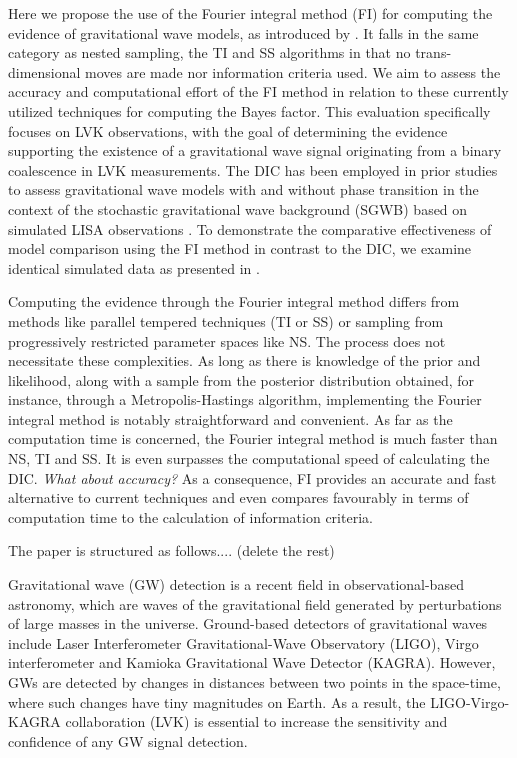 \documentclass[%
 reprint,
 amsmath,amssymb,
 aps,
]{revtex4-2}
\begin{document}
Here we propose the use of the Fourier integral method (FI) for computing the evidence of  gravitational wave models, as introduced by \cite{rotiroti2022computing}. It falls in the same category as nested sampling, the TI and SS algorithms in that no trans-dimensional moves are made nor information criteria used.
We aim to assess the accuracy and computational effort of the FI method in relation to these currently utilized techniques for computing the Bayes factor. This evaluation specifically focuses on LVK observations, with the goal of determining the evidence supporting the existence of a gravitational wave signal originating from a binary coalescence in LVK measurements.
The DIC has been employed in prior studies to assess gravitational wave models with and without phase transition in the context of the stochastic gravitational wave background (SGWB) based on simulated LISA observations \cite{BoileauGuillaume2023PfLt}. To demonstrate the comparative effectiveness of model comparison using the FI method in contrast to the DIC, we examine identical simulated data as presented in \cite{BoileauGuillaume2023PfLt}.

Computing the evidence through the Fourier integral method differs from methods like parallel tempered techniques (TI or SS) or sampling from progressively restricted parameter spaces like NS. The process does not necessitate these complexities. As long as there is knowledge of the prior and likelihood, along with a sample from the posterior distribution obtained, for instance, through a Metropolis-Hastings algorithm, implementing the Fourier integral method is notably straightforward and convenient. As far as the computation time is concerned,  the Fourier integral method is much faster than NS, TI and SS.  It is even  surpasses the computational speed of calculating the DIC. {\em What about accuracy?} As a consequence,
FI provides an accurate and fast alternative to current techniques and even compares favourably in terms of computation time to the calculation of information criteria.

The paper is structured as follows.... (delete the rest)

\bigskip

Gravitational wave (GW) detection is a recent field in observational-based astronomy, which are waves of the gravitational field generated by perturbations of large masses in the universe. Ground-based detectors of gravitational waves include Laser Interferometer Gravitational-Wave Observatory (LIGO), Virgo interferometer and Kamioka Gravitational Wave Detector (KAGRA). However, GWs are detected by changes in distances between two points in the space-time, where such changes have tiny magnitudes on Earth. As a result, the LIGO-Virgo-KAGRA collaboration (LVK) is essential to increase the sensitivity and confidence of any GW signal detection.
\end{document}
